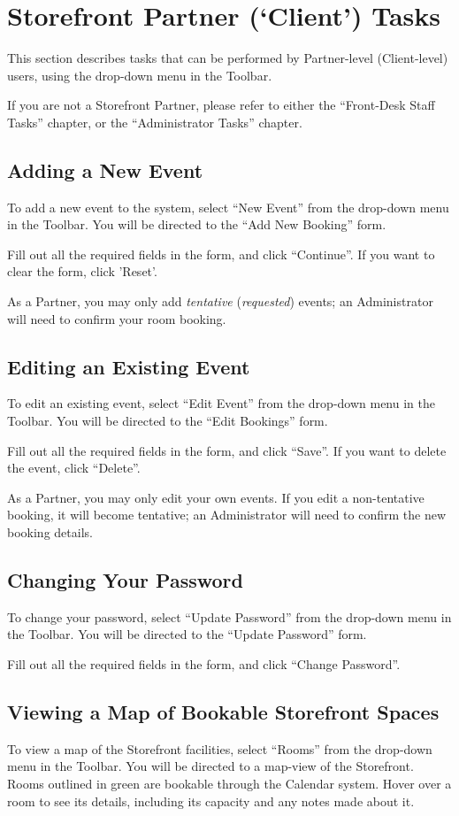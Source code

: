 \section{Storefront Partner (`Client') Tasks}

This section describes tasks that can be performed by Partner-level (Client-level) users, using the drop-down menu in the Toolbar.

If you are not a Storefront Partner, please refer to either the ``Front-Desk Staff Tasks'' chapter, or the ``Administrator Tasks'' chapter.


\subsection{Adding a New Event}

To add a new event to the system, select ``New Event'' from the drop-down menu in the Toolbar. You will be directed to the ``Add New Booking'' form.

Fill out all the required fields in the form, and click ``Continue''. If you want to clear the form, click 'Reset'.

As a Partner, you may only add \textit{tentative} (\textit{requested}) events; an Administrator will need to confirm your room booking.


\subsection{Editing an Existing Event}

To edit an existing event, select ``Edit Event'' from the drop-down menu in the Toolbar. You will be directed to the ``Edit Bookings'' form.

Fill out all the required fields in the form, and click ``Save''. If you want to delete the event, click ``Delete''.

As a Partner, you may only edit your own events. If you edit a non-tentative booking, it will become tentative; an Administrator will need to confirm the new booking details.


\subsection{Changing Your Password}

To change your password, select ``Update Password'' from the drop-down menu in the Toolbar. You will be directed to the ``Update Password'' form.

Fill out all the required fields in the form, and click ``Change Password''.


\subsection{Viewing a Map of Bookable Storefront Spaces}

To view a map of the Storefront facilities, select ``Rooms'' from the drop-down menu in the Toolbar. You will be directed to a map-view of the Storefront. Rooms outlined in green are bookable through the Calendar system. Hover over a room to see its details, including its capacity and any notes made about it.


